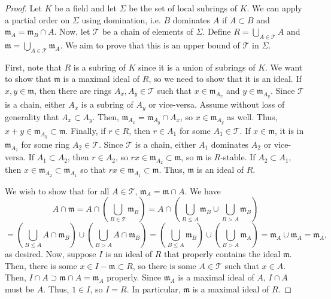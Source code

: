 \begin{proof}
Let $K$ be a field and let $\Sigma$ be the set of local subrings of $K$. We can apply a partial order on $\Sigma$ using domination, i.e. $B$ dominates $A$
if $A \subset B$ and $\mathfrak{m}_A = \mathfrak{m}_B \cap A$. Now, let $\mathcal{T}$ be a chain of elements of $\Sigma$. Define $R = \bigcup_{A \in \mathcal{T}} A$
and $\mathfrak{m} = \bigcup_{A \in \mathcal{T}}\mathfrak{m}_A$. We aim to prove that this is an upper bound of $\mathcal{T}$ in $\Sigma$.

First, note that $R$ is a subring of $K$ since it is a union of subrings of $K$. We want to show that $\mathfrak{m}$ is a maximal ideal of $R$, so we
need to show that it is an ideal. If $x, y \in \mathfrak{m}$, then there are rings $A_x , A_y \in \mathcal{T}$ such that $x \in \mathfrak{m}_{A_x}$ and
$y \in \mathfrak{m}_{A_y}$. Since $\mathcal{T}$ is a chain, either $A_x$ is a subring of $A_y$ or vice-versa. Assume without loss of generality that
$A_x \subset A_y$. Then, $\mathfrak{m}_{A_x} = \mathfrak{m}_{A_y} \cap A_x$, so $x \in \mathfrak{m}_{A_y}$ as well. Thus, $x + y \in \mathfrak{m}_{A_y} \subset \mathfrak{m}$.
Finally, if $r \in R$, then $r \in A_1$ for some $A_1 \in \mathcal{T}$. If $x \in \mathfrak{m}$, it is in $\mathfrak{m}_{A_2}$ for some ring $A_2 \in \mathcal{T}$.
Since $\mathcal{T}$ is a chain, either $A_1$ dominates $A_2$ or vice-versa. If $A_1 \subset A_2$, then $r \in A_2$, so $r x \in \mathfrak{m}_{A_2} \subset \mathfrak{m}$,
so $\mathfrak{m}$ is $R$-stable. If $A_2 \subset A_1$, then $x \in \mathfrak{m}_{A_2} \subset \mathfrak{m}_{A_1}$ so that $r x \in \mathfrak{m}_{A_1} \subset \mathfrak{m}$. Thus,
$\mathfrak{m}$ is an ideal of $R$.

We wish to show that for all $A \in \mathcal{T}$, $\mathfrak{m}_A = \mathfrak{m} \cap A$. We have
$$A \cap \mathfrak{m} = A \cap \left(\bigcup_{B \in \mathcal{T}}\mathfrak{m}_B\right)
= A \cap \left(\bigcup_{B \le A}\mathfrak{m}_B \cup \bigcup_{B > A}\mathfrak{m}_B\right)$$
$$= \left(\bigcup_{B \le A}A \cap\mathfrak{m}_B\right) \cup \left(\bigcup_{B > A}A \cap \mathfrak{m}_B\right)
= \left(\bigcup_{B \le A}\mathfrak{m}_B\right) \cup \left(\bigcup_{B > A}\mathfrak{m}_A\right)
= \mathfrak{m}_A \cup \mathfrak{m}_A = \mathfrak{m}_A,$$
as desired. Now, suppose $I$ is an ideal of $R$ that properly contains the ideal $\mathfrak{m}$. Then, there is some $x \in I - \mathfrak{m} \subset R$,
so there is some $A \in \mathcal{T}$ such that $x \in A$. Then, $I \cap A \supset \mathfrak{m} \cap A = \mathfrak{m}_A$ properly. Since $\mathfrak{m}_A$
is a maximal ideal of $A$, $I \cap A$ must be $A$. Thus, $1 \in I$, so $I = R$. In particular, $\mathfrak{m}$ is a maximal ideal of $R$.


\end{proof}
